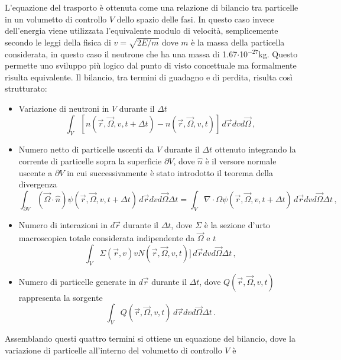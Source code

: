 L'equazione del trasporto è ottenuta come una relazione di bilancio tra 
particelle in un volumetto di controllo $V$ dello spazio delle fasi. In questo 
caso invece dell'energia viene utilizzata l'equivalente modulo di velocità, 
semplicemente secondo le leggi della fisica di $v=\sqrt{2E/m}$ dove $m$ è la 
massa della particella considerata, in questo caso il neutrone che ha una massa di 1.67$\cdot$10$^{-27}$kg. Questo permette uno sviluppo più logico dal 
punto di visto concettuale ma formalmente risulta equivalente.
Il bilancio, tra termini di guadagno e di perdita, risulta così strutturato:
\begin{itemize}
\item[-] Variazione di neutroni in $V$ durante il $\Delta t$
\begin{equation}
\int_V [n(\vec{r},\vec{\Omega},v,t+\Delta t)-n(\vec{r},\vec{\Omega},v,t)]\, 
d\vec{r}dvd\vec{\Omega} \,,
\end{equation}
\item[-] Numero netto di particelle uscenti da $V$ durante il $\Delta t$ 
ottenuto integrando la corrente di particelle sopra la superficie $\partial V$, 
dove $\hat{n}$ è il versore normale uscente a $\partial V$ in cui 
successivamente è stato introdotto il teorema della divergenza
\begin{equation}
\int_{\partial V} (\vec{\Omega} \cdot 
\hat{n})\psi(\vec{r},\vec{\Omega},v,t+\Delta t)\, d\vec{r}dvd\vec{\Omega}\Delta 
t=\int_V \nabla \cdot \Omega \psi(\vec{r},\vec{\Omega},v,t+\Delta t)\, 
d\vec{r}dvd\vec{\Omega}\Delta t \,,
\end{equation} 
\item[-] Numero di interazioni in $d\vec{r}$ durante il $\Delta t$, dove 
$\Sigma$ è la sezione d'urto macroscopica totale considerata indipendente da 
$\vec{\Omega}$ e $t$
\begin{equation}
\int_V \Sigma(\vec{r},v)vN(\vec{r},\vec{\Omega},v,t)]\, 
d\vec{r}dvd\vec{\Omega}\Delta t \,,
\end{equation}
\item[-] Numero di particelle generate in $d\vec{r}$ durante il $\Delta t$, dove 
$Q(\vec{r},\vec{\Omega},v,t)$ rappresenta la sorgente
\begin{equation}
\int_V Q(\vec{r},\vec{\Omega},v,t)\, d\vec{r}dvd\vec{\Omega}\Delta t \,.
\end{equation}

\end{itemize}
Assemblando questi quattro termini si ottiene un equazione del bilancio, dove la 
variazione di particelle all'interno del volumetto di controllo $V$ è 

